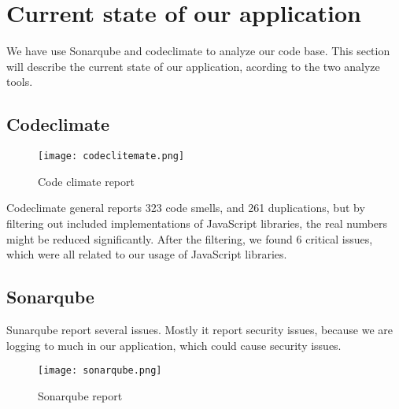 \section{Current state of our application}

We have use Sonarqube and codeclimate to analyze our code base. This section will describe the current state of our application, acording to the two analyze tools.

\subsection*{Codeclimate}

\begin{figure}[H]
	\centering
	\texttt{[image: codeclitemate.png]}
	\caption{Code climate report}
	\label{fig:Code climate}
\end{figure}

Codeclimate general reports 323 code smells, and 261 duplications,
but by filtering out included implementations of JavaScript libraries, the real numbers might be reduced significantly.
After the filtering, we found 6 critical issues, which were all related to our usage of JavaScript libraries.

\subsection*{Sonarqube}
Sunarqube report several issues. Mostly it report security issues, because we are logging to much in our application, which could cause security issues.
\begin{figure}[H]
	\centering
	\texttt{[image: sonarqube.png]}
	\caption{Sonarqube report}
	\label{fig:Sonarqube}
\end{figure}
